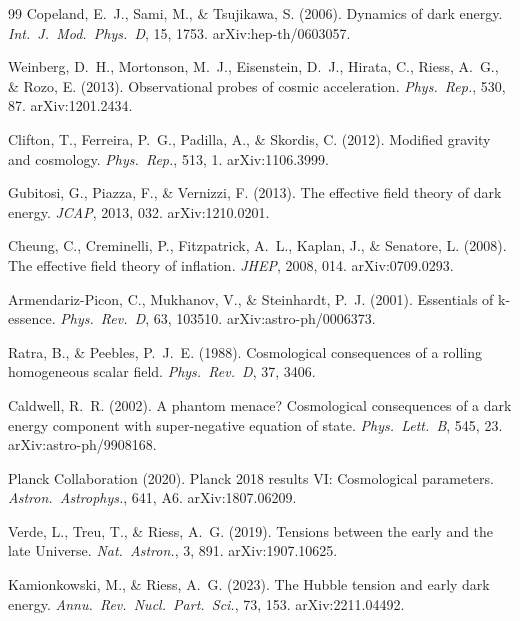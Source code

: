 \documentclass[12pt,a4paper]{article}
\begin{document}
\begin{thebibliography}{99}
  Copeland, E.~J., Sami, M., \& Tsujikawa, S. (2006).
  Dynamics of dark energy.
  \textit{Int.\ J.\ Mod.\ Phys.\ D}, 15, 1753.
  arXiv:hep-th/0603057.

  Weinberg, D.~H., Mortonson, M.~J., Eisenstein, D.~J., Hirata, C.,
  Riess, A.~G., \& Rozo, E. (2013).
  Observational probes of cosmic acceleration.
  \textit{Phys.\ Rep.}, 530, 87.
  arXiv:1201.2434.

  Clifton, T., Ferreira, P.~G., Padilla, A., \& Skordis, C. (2012).
  Modified gravity and cosmology.
  \textit{Phys.\ Rep.}, 513, 1.
  arXiv:1106.3999.

  Gubitosi, G., Piazza, F., \& Vernizzi, F. (2013).
  The effective field theory of dark energy.
  \textit{JCAP}, 2013, 032.
  arXiv:1210.0201.

  Cheung, C., Creminelli, P., Fitzpatrick, A.~L., Kaplan, J., \& Senatore, L.
  (2008).
  The effective field theory of inflation.
  \textit{JHEP}, 2008, 014.
  arXiv:0709.0293.

  Armendariz-Picon, C., Mukhanov, V., \& Steinhardt, P.~J. (2001).
  Essentials of k-essence.
  \textit{Phys.\ Rev.\ D}, 63, 103510.
  arXiv:astro-ph/0006373.

  Ratra, B., \& Peebles, P.~J.~E. (1988).
  Cosmological consequences of a rolling homogeneous scalar field.
  \textit{Phys.\ Rev.\ D}, 37, 3406.

  Caldwell, R.~R. (2002).
  A phantom menace? Cosmological consequences of a dark energy component with
  super-negative equation of state.
  \textit{Phys.\ Lett.\ B}, 545, 23.
  arXiv:astro-ph/9908168.

  Planck Collaboration (2020).
  Planck 2018 results VI: Cosmological parameters.
  \textit{Astron.\ Astrophys.}, 641, A6.
  arXiv:1807.06209.

  Verde, L., Treu, T., \& Riess, A.~G. (2019).
  Tensions between the early and the late Universe.
  \textit{Nat.\ Astron.}, 3, 891.
  arXiv:1907.10625.

  Kamionkowski, M., \& Riess, A.~G. (2023).
  The Hubble tension and early dark energy.
  \textit{Annu.\ Rev.\ Nucl.\ Part.\ Sci.}, 73, 153.
  arXiv:2211.04492.


\end{thebibliography}
\end{document}
